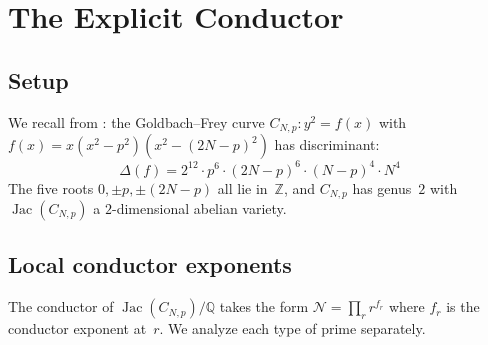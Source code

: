 \documentclass[11pt,a4paper]{article}
\theoremstyle{definition}
\DeclareMathOperator{\Jac}{Jac}
\begin{document}
\section{The Explicit Conductor}\label{sec:conductor}

\subsection{Setup}

We recall from \cite{Companion7}: the Goldbach--Frey curve $C_{N,p} : y^2 = f(x)$ with $f(x) = x(x^2 - p^2)(x^2 - (2N-p)^2)$ has discriminant:
$$\Delta(f) = 2^{12} \cdot p^6 \cdot (2N-p)^6 \cdot (N-p)^4 \cdot N^4$$
The five roots $0, \pm p, \pm(2N-p)$ all lie in~$\mathbb{Z}$, and $C_{N,p}$ has genus~$2$ with $\Jac(C_{N,p})$ a $2$-dimensional abelian variety.

\subsection{Local conductor exponents}

The conductor of $\Jac(C_{N,p})/\mathbb{Q}$ takes the form $\mathcal{N} = \prod_r r^{f_r}$ where $f_r$ is the conductor exponent at~$r$. We analyze each type of prime separately.
\end{document}
